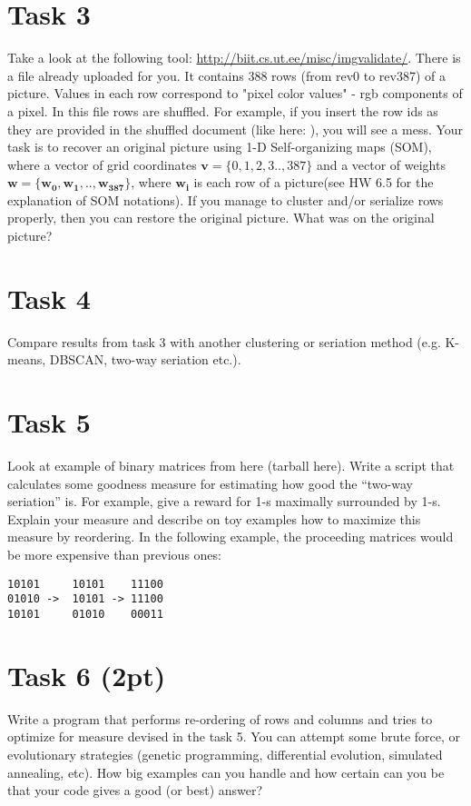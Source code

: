 \documentclass{article}
\begin{document}
\section*{Task 3}
Take a look at the following tool: \url{http://biit.cs.ut.ee/misc/imgvalidate/}. There is a file already uploaded for you. It contains 388 rows (from rev0 to rev387) of a picture. Values in each row correspond to "pixel color values" - rgb components of a pixel. In this file rows are shuffled. For example, if you insert the row ids as they are provided in the shuffled document (like here: ), you will see a mess. Your task is to recover an original picture using 1-D Self-organizing maps (SOM), where a vector of grid coordinates $\mathbf{v} = \{0,1,2,3..,387\}$ and a vector of weights $\mathbf{w} = \{\boldsymbol{w_0,w_1,..,w_{387}}\}$, 
where $\boldsymbol{w_i}$ is each row of a picture(see HW 6.5 for the explanation of SOM notations).
If you manage to cluster and/or serialize rows properly, then you can restore the original picture. What was on the original picture?

\section*{Task 4}
Compare results from task 3 with another clustering or seriation method (e.g. K-means, DBSCAN, two-way seriation etc.).

\section*{Task 5}
Look at example of binary matrices from here (tarball here). Write a script that calculates some goodness measure for estimating how good the “two-way seriation” is. For example, give a reward for 1-s maximally surrounded by 1-s. Explain your measure and describe on toy examples how to maximize this measure by reordering. In the following example, the proceeding matrices would be more expensive than previous ones:
\begin{verbatim}
10101     10101    11100
01010 ->  10101 -> 11100
10101     01010    00011 
\end{verbatim}


\section*{Task 6 (2pt)}
Write a program that performs re-ordering of rows and columns and tries to optimize for measure devised in the task 5. You can attempt some brute force, or evolutionary strategies (genetic programming, differential evolution, simulated annealing, etc). How big examples can you handle and how certain can you be that your code gives a good (or best) answer?
\end{document}
